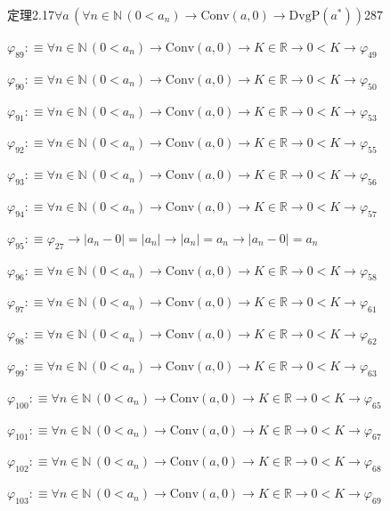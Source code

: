 \begin{fullproof}{定理2.17}{$\forall a\,(\forall n \in \mathbb{N}\,(0 < a_{n}) \to \mathrm{Conv}(a,0) \to \mathrm{DvgP}(a^{\ast}))$}{287}
\begin{abbrevlist}
\item $\varphi_{89} :\equiv \forall n \in \mathbb{N}\,(0 < a_{n}) \to \mathrm{Conv}(a,0) \to K \in \mathbb{R} \to 0 < K \to \varphi_{49}$
\item $\varphi_{90} :\equiv \forall n \in \mathbb{N}\,(0 < a_{n}) \to \mathrm{Conv}(a,0) \to K \in \mathbb{R} \to 0 < K \to \varphi_{50}$
\item $\varphi_{91} :\equiv \forall n \in \mathbb{N}\,(0 < a_{n}) \to \mathrm{Conv}(a,0) \to K \in \mathbb{R} \to 0 < K \to \varphi_{53}$
\item $\varphi_{92} :\equiv \forall n \in \mathbb{N}\,(0 < a_{n}) \to \mathrm{Conv}(a,0) \to K \in \mathbb{R} \to 0 < K \to \varphi_{55}$
\item $\varphi_{93} :\equiv \forall n \in \mathbb{N}\,(0 < a_{n}) \to \mathrm{Conv}(a,0) \to K \in \mathbb{R} \to 0 < K \to \varphi_{56}$
\item $\varphi_{94} :\equiv \forall n \in \mathbb{N}\,(0 < a_{n}) \to \mathrm{Conv}(a,0) \to K \in \mathbb{R} \to 0 < K \to \varphi_{57}$
\item $\varphi_{95} :\equiv \varphi_{27} \to \lvert a_{n} - 0 \rvert = \lvert a_{n} \rvert \to \lvert a_{n} \rvert = a_{n} \to \lvert a_{n} - 0 \rvert = a_{n}$
\item $\varphi_{96} :\equiv \forall n \in \mathbb{N}\,(0 < a_{n}) \to \mathrm{Conv}(a,0) \to K \in \mathbb{R} \to 0 < K \to \varphi_{58}$
\item $\varphi_{97} :\equiv \forall n \in \mathbb{N}\,(0 < a_{n}) \to \mathrm{Conv}(a,0) \to K \in \mathbb{R} \to 0 < K \to \varphi_{61}$
\item $\varphi_{98} :\equiv \forall n \in \mathbb{N}\,(0 < a_{n}) \to \mathrm{Conv}(a,0) \to K \in \mathbb{R} \to 0 < K \to \varphi_{62}$
\item $\varphi_{99} :\equiv \forall n \in \mathbb{N}\,(0 < a_{n}) \to \mathrm{Conv}(a,0) \to K \in \mathbb{R} \to 0 < K \to \varphi_{63}$
\item $\varphi_{100} :\equiv \forall n \in \mathbb{N}\,(0 < a_{n}) \to \mathrm{Conv}(a,0) \to K \in \mathbb{R} \to 0 < K \to \varphi_{65}$
\item $\varphi_{101} :\equiv \forall n \in \mathbb{N}\,(0 < a_{n}) \to \mathrm{Conv}(a,0) \to K \in \mathbb{R} \to 0 < K \to \varphi_{67}$
\item $\varphi_{102} :\equiv \forall n \in \mathbb{N}\,(0 < a_{n}) \to \mathrm{Conv}(a,0) \to K \in \mathbb{R} \to 0 < K \to \varphi_{68}$
\item $\varphi_{103} :\equiv \forall n \in \mathbb{N}\,(0 < a_{n}) \to \mathrm{Conv}(a,0) \to K \in \mathbb{R} \to 0 < K \to \varphi_{69}$

\end{abbrevlist}
\end{fullproof}
